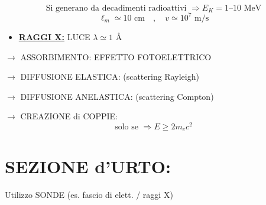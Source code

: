 \documentclass[12pt,a4paper]{article}
\begin{document}
\begin{equation*}
    \text{Si generano da decadimenti radioattivi } \Rightarrow E_K = 1 \text{--} 10 \text{ MeV}
\end{equation*}
\begin{equation*}
    \ell_m \simeq 10 \text{ cm} \quad , \quad v \simeq 10^7 \text{ m/s}
\end{equation*}

\vspace{0.8cm}
\begin{itemize}
    \item \underline{\textbf{RAGGI X:}} \qquad LUCE \quad $\lambda \simeq 1 \text{ \AA}$
\end{itemize}

\vspace{0.3cm}
$\rightarrow$ ASSORBIMENTO: \hfill EFFETTO FOTOELETTRICO

\vspace{0.3cm}
$\rightarrow$ DIFFUSIONE ELASTICA: (scattering Rayleigh)

\vspace{0.3cm}
$\rightarrow$ DIFFUSIONE ANELASTICA: (scattering Compton)

\vspace{0.3cm}
$\rightarrow$ CREAZIONE di COPPIE: 
\begin{equation*}
    \text{solo se } \Rightarrow E \ge 2m_e c^2
\end{equation*}

\newpage
\section*{SEZIONE d'URTO:}

Utilizzo SONDE (es. fascio di elett. / raggi X)
\end{document}
